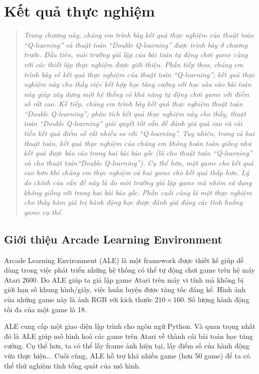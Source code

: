 \chapter{Kết quả thực nghiệm}
\ifpdf
\graphicspath{{Chapter4/Chapter4Figs/PNG/}{Chapter4/Chapter4Figs/PDF/}{Chapter4/Chapter4Figs/}}
\else
\graphicspath{{Chapter4/Chapter4Figs/EPS/}{Chapter4/Chapter4Figs/}}
\fi
\begin{quote}
	\textit{Trong chương này, chúng em trình bày kết quả thực nghiệm của thuật toán ``Q-learning'' và thuật toán ``Double Q-learning'' được trình bày ở chương trước.
	Đầu tiên, môi trường giả lập của bài toán tự động chơi game cùng với các thiết lập thực nghiệm được giới thiệu.
	Phần tiếp theo, chúng em trình bày về kết quả thực nghiệm của thuật toán ``Q-learning''; kết quả thực nghiệm này cho thấy việc kết hợp học tăng cường với học sâu vào bài toán này giúp xây dựng một hệ thống có khả năng tự động chơi game với điểm số rất cao.
	Kế tiếp, chúng em trình bày kết quả thực nghiệm thuật toán ``Double Q-learning''; phân tích kết quả thực nghiệm này cho thấy, thuật toán ``Double Q-learning'' giải quyết tốt vấn đề đánh giá quá cao và cải tiến kết quả điểm số rất nhiều so với ``Q-learning''.
	Tuy nhiên, trong cả hai thuật toán, kết quả thực nghiệm của chúng em không hoàn toàn giống như kết quả được báo cáo trong hai bài báo gốc (là \cite{mnihdqn2015} cho thuật toán ``Q-learning'' và \cite{van2015deep} cho thuật toán``Double Q-learning'').
	Cụ thể hơn, một game cho kết quả cao hơn khi chúng em thực nghiệm và hai game cho kết quả thấp hơn.
	Lý do chính của vấn đề này là do môi trường giả lập game mà nhóm sử dụng không giống với trong hai bài báo gốc.
	Phần cuối cùng là một thực nghiệm cho thấy hàm giá trị hành động học được đánh giá đúng các tình huống game cụ thể.}
\end{quote}
 
\section{Giới thiệu Arcade Learning Environment}
Arcade Learning Environment (ALE) \cite{bellemare2012arcade} là một framework được thiết kế giúp dễ dàng trong việc phát triển những hệ thống có thể tự động chơi game trên hệ máy Atari 2600.
Do ALE giúp ta giả lập game Atari trên máy vi tính mà không bị giới hạn số khung hình/giây, việc huấn luyện được tăng tốc đáng kể.
Hình ảnh của những game này là ảnh RGB với kích thước $210 \times 160$. 
Số lượng hành động tối đa của một game là 18.

ALE cung cấp một giao diện lập trình cho ngôn ngữ Python.
Và quan trọng nhất đó là ALE giúp mô hình hoá các game trên Atari về thành cái bài toán học tăng cường.
Cụ thể hơn, ta có thể lấy frame ảnh hiện tại, lấy điểm số của hành động vừa thực hiện...
Cuối cùng, ALE hỗ trợ khá nhiều game (hơn 50 game) để ta có thể thử nghiệm tính tổng quát của mô hình.


